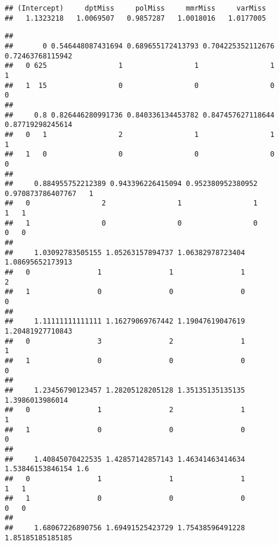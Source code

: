 \documentclass[]{article}
\newenvironment{Shaded}{\begin{snugshade}}{\end{snugshade}}
\newcommand{\CommentTok}[1]{\textcolor[rgb]{0.56,0.35,0.01}{\textit{#1}}}
\newcommand{\DataTypeTok}[1]{\textcolor[rgb]{0.13,0.29,0.53}{#1}}
\newcommand{\KeywordTok}[1]{\textcolor[rgb]{0.13,0.29,0.53}{\textbf{#1}}}
\newcommand{\NormalTok}[1]{#1}
\newcommand{\OperatorTok}[1]{\textcolor[rgb]{0.81,0.36,0.00}{\textbf{#1}}}
\newcommand{\StringTok}[1]{\textcolor[rgb]{0.31,0.60,0.02}{#1}}
\begin{document}
\begin{verbatim}
## (Intercept)     dptMiss     polMiss     mmrMiss     varMiss 
##   1.1323218   1.0069507   0.9857287   1.0018016   1.0177005
\end{verbatim}

\begin{Shaded}
\end{Shaded}

\begin{verbatim}
##    
##       0 0.546448087431694 0.689655172413793 0.704225352112676 0.72463768115942
##   0 625                 1                 1                 1                1
##   1  15                 0                 0                 0                0
##    
##     0.8 0.826446280991736 0.840336134453782 0.847457627118644 0.87719298245614
##   0   1                 2                 1                 1                1
##   1   0                 0                 0                 0                0
##    
##     0.884955752212389 0.943396226415094 0.952380952380952 0.970873786407767   1
##   0                 2                 1                 1                 1   1
##   1                 0                 0                 0                 0   0
##    
##     1.03092783505155 1.05263157894737 1.06382978723404 1.08695652173913
##   0                1                1                1                2
##   1                0                0                0                0
##    
##     1.11111111111111 1.16279069767442 1.19047619047619 1.20481927710843
##   0                3                2                1                1
##   1                0                0                0                0
##    
##     1.23456790123457 1.28205128205128 1.35135135135135 1.3986013986014
##   0                1                2                1               1
##   1                0                0                0               0
##    
##     1.40845070422535 1.42857142857143 1.46341463414634 1.53846153846154 1.6
##   0                1                1                1                1   1
##   1                0                0                0                0   0
##    
##     1.68067226890756 1.69491525423729 1.75438596491228 1.85185185185185

\end{verbatim}
\end{document}
